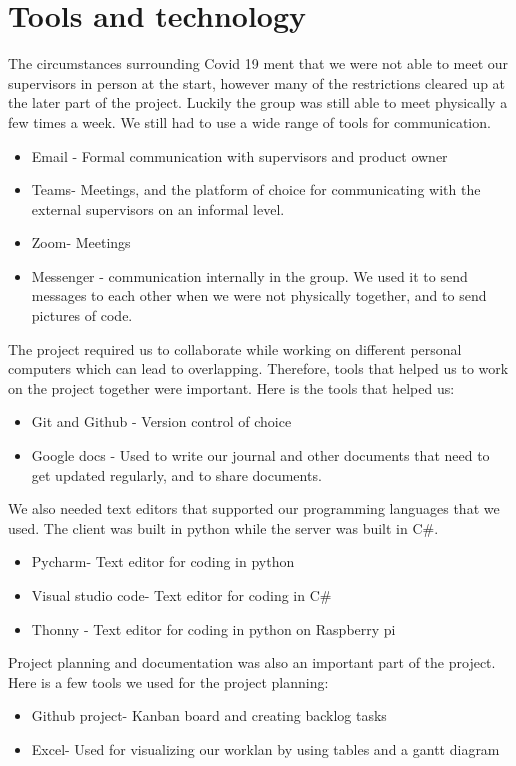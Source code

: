 \section{Tools and technology}
The circumstances surrounding Covid 19 ment that we were not able to meet our supervisors in person at the start, however many of the restrictions cleared up at the later part of the project. Luckily the group was still able to meet physically a few times a week. We still had to use a wide range of tools for communication.
\begin{itemize}
	\item Email - Formal communication with supervisors and product owner
	\item Teams- Meetings, and the platform of choice for communicating with the external supervisors on an informal level. 
	\item Zoom- Meetings
	\item Messenger - communication internally in the group. We used it to send messages to each other when we were not physically together, and to send pictures of code. 
\end{itemize}

The project required us to collaborate while working on different personal computers which can lead to overlapping. Therefore, tools that helped us to work on the project together were important. Here is the tools that helped us:

\begin{itemize}
	\item Git and Github - Version control of choice
	\item Google docs - Used to write our journal and other documents that need to get updated regularly, and to share documents. 
\end{itemize}

We also needed text editors that supported our programming languages that we used. The client was built in python while the server was built in C\#. 

\begin{itemize}
	\item Pycharm- Text editor for coding in python
	\item Visual studio code- Text editor for coding in C\#
	\item Thonny - Text editor for coding in python on Raspberry pi
\end{itemize}

Project planning and documentation was also an important part of the project. Here is a few tools we used for the project planning:

\begin{itemize}
	\item Github project- Kanban board and creating backlog tasks
	\item Excel- Used for visualizing our worklan by using tables and a gantt diagram
\end{itemize}
